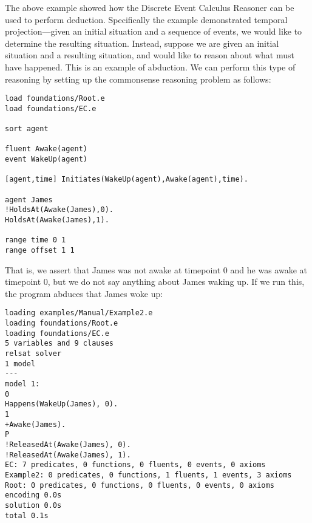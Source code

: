 \documentclass{article}
\begin{document}
The above example showed how the Discrete Event Calculus Reasoner can be
used to perform deduction. Specifically the example demonstrated temporal
projection---given an initial situation and a sequence of events, we
would like to determine the resulting situation. Instead, suppose we
are given an initial situation and a resulting situation, and would
like to reason about what must have happened. This is an example of
abduction. We can perform this type of reasoning by setting up the
commonsense reasoning problem as follows:
\begin{verbatim}
load foundations/Root.e
load foundations/EC.e

sort agent

fluent Awake(agent)
event WakeUp(agent)

[agent,time] Initiates(WakeUp(agent),Awake(agent),time).

agent James
!HoldsAt(Awake(James),0).
HoldsAt(Awake(James),1).

range time 0 1
range offset 1 1
\end{verbatim}
That is, we assert that James was not awake at timepoint 0 and he was
awake at timepoint 0, but we do not say anything about James waking
up. If we run this, the program abduces that James woke up:
\begin{verbatim}
loading examples/Manual/Example2.e
loading foundations/Root.e
loading foundations/EC.e
5 variables and 9 clauses
relsat solver
1 model
---
model 1:
0
Happens(WakeUp(James), 0).
1
+Awake(James).
P
!ReleasedAt(Awake(James), 0).
!ReleasedAt(Awake(James), 1).
EC: 7 predicates, 0 functions, 0 fluents, 0 events, 0 axioms
Example2: 0 predicates, 0 functions, 1 fluents, 1 events, 3 axioms
Root: 0 predicates, 0 functions, 0 fluents, 0 events, 0 axioms
encoding 0.0s
solution 0.0s
total 0.1s
\end{verbatim}
\end{document}
